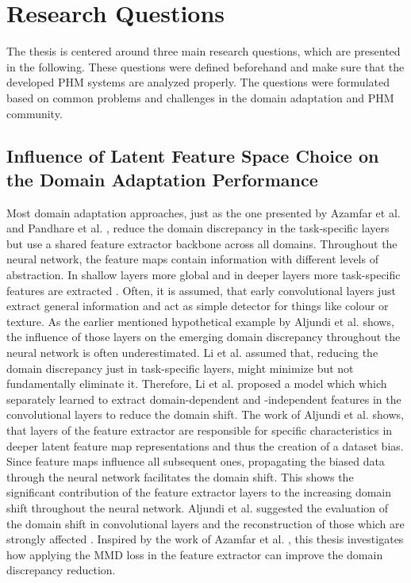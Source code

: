 \chapter{Research Questions}\label{chapter:research_approach}
The thesis is centered around three main research questions, which are presented in the following. These questions were defined beforehand and make sure that the developed PHM systems are analyzed properly. The questions were formulated based on common problems and challenges in the domain adaptation and PHM community. 

\section{Influence of Latent Feature Space Choice on the Domain Adaptation Performance}
Most domain adaptation approaches, just as the one presented by Azamfar et al. \cite{AZAMFAR2020103932} and Pandhare et al. \cite{Pandhare2021}, reduce the domain discrepancy in the task-specific layers but use a shared feature extractor backbone across all domains. Throughout the neural network, the feature maps contain information with different levels of abstraction. In shallow layers more global and in deeper layers more task-specific features are extracted \cite{Aljundi2016}. Often, it is assumed, that early convolutional layers just extract general information and act as simple detector for things like colour or texture. As the earlier mentioned hypothetical example by Aljundi et al. \cite{Aljundi2016} shows, the influence of those layers on the emerging domain discrepancy throughout the neural network is often underestimated. Li et al. \cite{li2020} assumed that, reducing the domain discrepancy just in task-specific layers, might minimize but not fundamentally eliminate it. Therefore, Li et al. \cite{li2020} proposed a model which which separately learned to extract domain-dependent and -independent features in the convolutional layers to reduce the domain shift. The work of Aljundi et al. \cite{Aljundi2016} shows, that layers of the feature extractor are responsible for specific characteristics in deeper latent feature map representations and thus the creation of a dataset bias. Since feature maps influence all subsequent ones, propagating the biased data through the neural network facilitates the domain shift. This shows the significant contribution of the feature extractor layers to the increasing domain shift throughout the neural network. Aljundi et al. suggested the evaluation of the domain shift in convolutional layers and the reconstruction of those which are strongly affected \cite{Aljundi2016}. Inspired by the work of Azamfar et al. \cite{Aljundi2016}, this thesis investigates how applying the MMD loss in the feature extractor can improve the domain discrepancy reduction.


